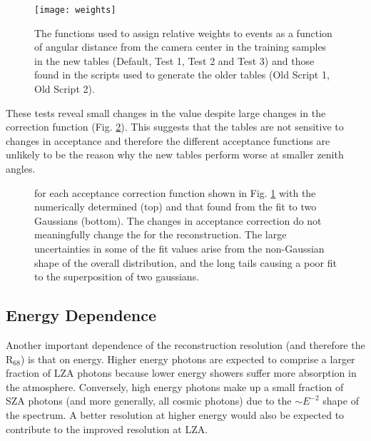 \documentclass[main.tex]{subfiles}
\begin{document}
\begin{figure}[htbp]
  \centering
  \texttt{[image: weights]}
  \caption[Weight functions for offset from camera center.]{The functions used to assign relative weights to events as a function of angular distance from the camera center in the training samples in the new tables (Default, Test 1, Test 2 and Test 3) and those found in the scripts used to generate the older tables (Old Script 1, Old Script 2).}
  \label{fig:weights}
\end{figure}

These tests reveal small changes in the \rse value despite large changes in the correction function (Fig. \ref{fig:weight_tests}). This suggests that the \disp tables are not sensitive to changes in acceptance and therefore the different acceptance functions are unlikely to be the reason why the new \disp tables perform worse at smaller zenith angles.

\begin{figure}[H]
  \centering
  \caption[\rse for the acceptance correction functions.]{\rse for each acceptance correction function shown in Fig. \ref{fig:weights} with the numerically determined \rse (top) and that found from the fit to two Gaussians (bottom). The changes in acceptance correction do not meaningfully change the \rse for the reconstruction. The large uncertainties in some of the fit values arise from the non-Gaussian shape of the overall distribution, and the long tails causing a poor fit to the superposition of two gaussians.}
  \label{fig:weight_tests}
\end{figure}

\subsection{Energy Dependence}
Another important dependence of the reconstruction resolution (and therefore the R$_{68}$) is that on energy. Higher energy photons are expected to comprise a larger fraction of LZA photons because lower energy showers suffer more absorption in the atmosphere. Conversely, high energy photons make up a small fraction of SZA photons (and more generally, all cosmic photons) due to the $\sim E^{-2}$ shape of the spectrum. A better resolution at higher energy would also be expected to contribute to the improved resolution at LZA.
\end{document}
